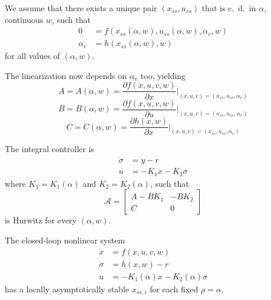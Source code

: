 \newpar{}

We assume that there exists a unique pair $(x_{ss}, u_{ss})$ that is c.\ d.\ in $\alpha$, continuous $w$, such that
\begin{align*}
    0        & = f(x_{ss}(\alpha, w), u_{ss}(\alpha, w), \alpha_v, w) \\
    \alpha_r & = h(x_{ss}(\alpha, w), w)
\end{align*}
for all values of $(\alpha, w)$.

\newpar{}

The linearization now depends on $\alpha_v$ too, yielding
\begin{equation*}
    A = A(\alpha, w) = \frac{\partial f(x, u, v, w)}{\partial x} \bigg|_{(x, u, v) = (x_{ss}, u_{ss}, \alpha_v)}
\end{equation*}
\begin{equation*}
    B = B(\alpha, w) = \frac{\partial f(x, u, v, w)}{\partial u} \bigg|_{(x, u, v) = (x_{ss}, u_{ss}, \alpha_v)}
\end{equation*}
\begin{equation*}
    C = C(\alpha, w) = \frac{\partial h(x, w)}{\partial x} \bigg|_{(x, u, v) = (x_{ss}, u_{ss}, \alpha_v)}
\end{equation*}

\newpar{}

The integral controller is
\begin{align*}
    \dot{\sigma} & = y - r               \\
    u            & = -K_1 x - K_2 \sigma
\end{align*}
where $K_1 = K_1(\alpha)$ and $K_2 = K_2(\alpha)$, such that
\begin{equation*}
    \mathcal{A} = \begin{bmatrix} A - BK_1 & -BK_2 \\ C & 0 \end{bmatrix}
\end{equation*}
is Hurwitz for every $(\alpha, w)$.

\newpar{}

The closed-loop nonlinear system
\begin{align*}
    \dot{x}      & = f(x, u, v, w)                     \\
    \dot{\sigma} & = h(x, w) - r                       \\
    u            & = -K_1(\alpha)x - K_2(\alpha)\sigma
\end{align*}
has a locally asymptotically stable $x_{ss,i}$ for each fixed $\rho = \alpha$.



